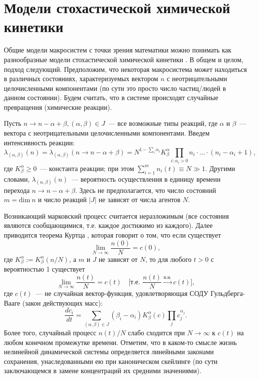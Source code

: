 \documentclass[12pt]{article}
\begin{document}
\section*{Модели стохастической химической кинетики}

Общие модели макросистем с точки зрения математики можно понимать как разнообразные модели стохастической химической кинетики \cite{buzun2017stochastic, gasnikov2021lecture}. В общем и целом, подход следующий. Предположим, что некоторая макросистема может находиться в различных состояниях, характеризуемых вектором $n$ с неотрицательными целочисленными компонентами (по сути это просто число частиц/людей в данном состоянии). Будем считать, что в системе происходят случайные превращения (химические реакции).

Пусть $n \to n - \alpha + \beta, (\alpha, \beta) \in J$~--- все возможные типы реакций, где $\alpha$ и $\beta$~--- вектора с неотрицательными целочисленными компонентами. Введем интенсивность реакции:
\[ \lambda_{(\alpha, \beta)}(n) = \lambda_{(\alpha, \beta)}(n \to n - \alpha + \beta) = N^{1 - \sum\limits_{i} \alpha_i} K^{\alpha}_{\beta} \prod_{i: \alpha_i > 0} n_i \cdot \ldots \cdot (n_i - \alpha_i + 1), \]
где $K^{\alpha}_{\beta} \geqslant 0$~--- константа реакции; при этом $\sum\limits_{i=1}^m n_i(t) \equiv N \gg 1$. Другими словами, $\lambda_{(\alpha, \beta)}(n)$~--- вероятность осуществления в единицу времени перехода $n \to n - \alpha + \beta$. Здесь не предполагается, что число состояний $m = \mathrm{dim} \ n$ и число реакций $|J|$ не зависят от числа агентов $N$. 

Возникающий марковский процесс считается неразложимым (все состояния являются сообщающимися, т.е. каждое достижимо из каждого). Далее приводится теорема Куртца \cite{buzun2017stochastic, gasnikov2021lecture}, которая говорит о том, что если существует 
\[ \lim_{N \to \infty} \dfrac{n(0)}{N} = c(0), \]
где $K^{\alpha}_{\beta} := K^{\alpha}_{\beta}(n/N)$, а $m$ и $J$ не зависят от $N$, то для любого $t > 0$ с вероятностью 1 существует
\[ \lim_{N \to \infty} \dfrac{n(t)}{N} = c(t) \quad \Big[ \text{т.е. } \dfrac{n(t)}{N} \xrightarrow{\text{п.н.}} c(t) \Big], \]
где $c(t)$~--- не случайная вектор-функция, удовлетворяющая СОДУ Гульдберга-Вааге (закон действующих масс):
\[ \dfrac{dc_i}{dt} = \sum\limits_{(\alpha, \beta) \in J} \left( \beta_i - \alpha_i \right) K^{\alpha}_{\beta}(c) \prod_j c_j^{\alpha_j}. \]
Более того, случайный процесс $n(t)/N$ слабо сходится при $N \to \infty$ к $c(t)$ на любом конечном промежутке времени. Отметим, что в каком-то смысле жизнь нелинейной динамической системы определяется линейными законами сохранения, унаследованными ею при каноническом скейлинге (по сути заключающемся в замене концентраций их средними значениями).
\end{document}
